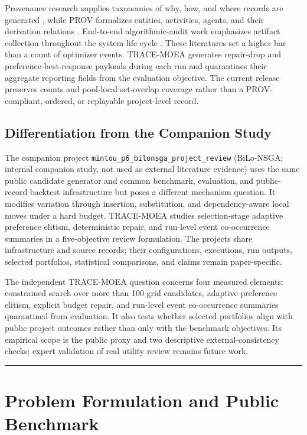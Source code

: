\documentclass[energies,article,submit,moreauthors]{Definitions/mdpi}
\begin{document}
Provenance research supplies taxonomies of why, how, and where records are generated \cite{ref25}, while PROV formalizes entities, activities, agents, and their derivation relations \cite{ref26}. End-to-end algorithmic-audit work emphasizes artifact collection throughout the system life cycle \cite{ref27}. These literatures set a higher bar than a count of optimizer events. TRACE-MOEA generates repair-drop and preference-best-response payloads during each run and quarantines their aggregate reporting fields from the evaluation objective. The current release preserves counts and pool-local set-overlap coverage rather than a PROV-compliant, ordered, or replayable project-level record.

\subsection{Differentiation from the Companion Study}\label{differentiation-from-the-companion-study}

The companion project \texttt{mintou\_p6\_bilonsga\_project\_review} (BiLo-NSGA; internal companion study, not used as external literature evidence) uses the same public candidate generator and common benchmark, evaluation, and public-record backtest infrastructure but poses a different mechanism question. It modifies variation through insertion, substitution, and dependency-aware local moves under a hard budget. TRACE-MOEA studies selection-stage adaptive preference elitism, deterministic repair, and run-level event co-occurrence summaries in a five-objective review formulation. The projects share infrastructure and source records; their configurations, executions, run outputs, selected portfolios, statistical comparisons, and claims remain paper-specific.

The independent TRACE-MOEA question concerns four measured elements: constrained search over more than 100 grid candidates, adaptive preference elitism, explicit budget repair, and run-level event co-occurrence summaries quarantined from evaluation. It also tests whether selected portfolios align with public project outcomes rather than only with the benchmark objectives. Its empirical scope is the public proxy and two descriptive external-consistency checks; expert validation of real utility review remains future work.

\begin{center}\rule{0.5\linewidth}{0.5pt}\end{center}

\section{Problem Formulation and Public Benchmark}\label{problem-formulation-and-public-benchmark}
\end{document}
